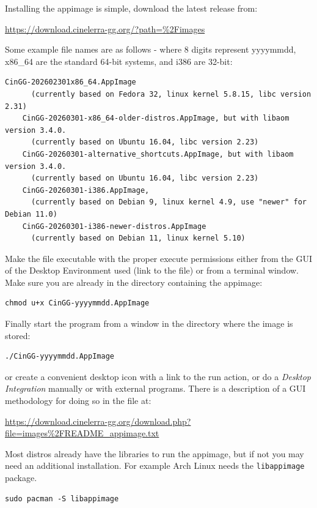 Installing the appimage is simple, download the latest release from:

{\small \url{https://download.cinelerra-gg.org/?path=\%2Fimages}}

Some example file names are as follows - where 8 digits represent yyyymmdd, x86\_64 are the standard 64-bit systems, and i386 are 32-bit:

\begin{lstlisting}[style=sh]
	CinGG-202602301x86_64.AppImage
	  (currently based on Fedora 32, linux kernel 5.8.15, libc version 2.31)
	CinGG-20260301-x86_64-older-distros.AppImage, but with libaom version 3.4.0.
	  (currently based on Ubuntu 16.04, libc version 2.23)
	CinGG-20260301-alternative_shortcuts.AppImage, but with libaom version 3.4.0.
	  (currently based on Ubuntu 16.04, libc version 2.23)
	CinGG-20260301-i386.AppImage,
	  (currently based on Debian 9, linux kernel 4.9, use "newer" for Debian 11.0)
	CinGG-20260301-i386-newer-distros.AppImage
	  (currently based on Debian 11, linux kernel 5.10)
\end{lstlisting}

Make the file executable with the proper execute permissions either from the GUI of the Desktop Environment used (link to the file) or from a terminal window.  Make sure you are already in the directory containing the appimage:

\begin{lstlisting}[style=sh]
	chmod u+x CinGG-yyyymmdd.AppImage
\end{lstlisting}

Finally start the program from a window in the directory where the image is stored:

\begin{lstlisting}[style=sh]
	./CinGG-yyyymmdd.AppImage
\end{lstlisting}

or create a convenient desktop icon with a link to the run action, or do a \textit{Desktop Integration} manually or with external programs.  There is a 
description of a GUI methodology for doing so in the file at:

{\small \url{https://download.cinelerra-gg.org/download.php?file=images\%2FREADME_appimage.txt}}

Most distros already have the libraries to run the appimage, but if not you may need an additional installation. For example Arch Linux needs the \texttt{libappimage} package.

\begin{lstlisting}[style=sh]
	sudo pacman -S libappimage
\end{lstlisting}

